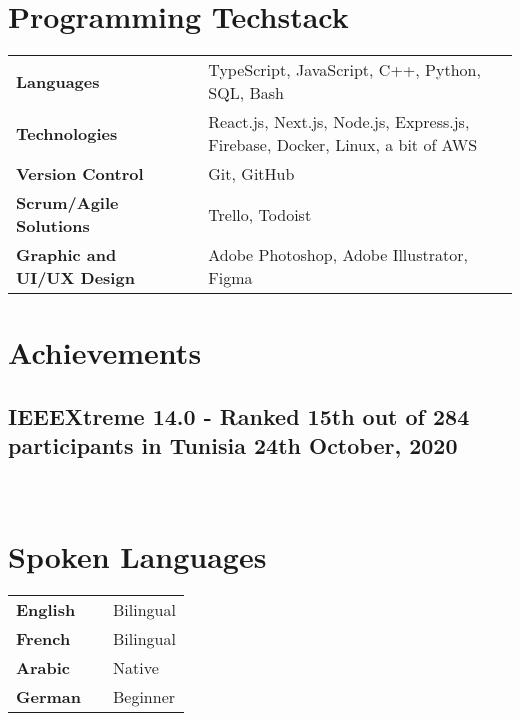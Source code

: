 \documentclass[a4,10pt]{article}
\newcommand{\subtext}[1]{
#1\par\vspace{-0.2cm}}
\newenvironment{zitemize}{
\begin{itemize}\itemsep0pt \parskip0pt \parsep1pt}
{\end{itemize}\vspace{-0.5cm}}
\newcommand{\hskills}[1]{
\textbf{\bfseries #1} }
\begin{document}
\section{Programming Techstack}
\begin{tabular}{p{11em} p{1em} p{43em}}
\hskills{Languages }&  & TypeScript, JavaScript, C++, Python, SQL, Bash \\
\hskills{Technologies} &  & React.js, Next.js, Node.js, Express.js, Firebase, Docker, Linux, a bit of AWS \\
\hskills{Version Control} &  & Git, GitHub \\
\hskills{Scrum/Agile Solutions} &  & Trello, Todoist \\
\hskills{Graphic and UI/UX Design} &  & Adobe Photoshop, Adobe Illustrator, Figma
\\
\end{tabular}

\section{Achievements} 
\subsection*{ IEEEXtreme 14.0 - Ranked 15th out of 284 participants in Tunisia \hfill 24th October, 2020} 
\subtext{} 
    \begin{zitemize}
        \  
    \end{zitemize}

\section{Spoken Languages}
\begin{tabular}{p{11em} p{1em} p{43em}}
\hskills{English}&  &  Bilingual\\
\hskills{French}&  &  Bilingual\\
\hskills{Arabic}&  &  Native\\
\hskills{German}&  &  Beginner\\
\end{tabular}

\vspace{-0.2cm}
\end{document}

